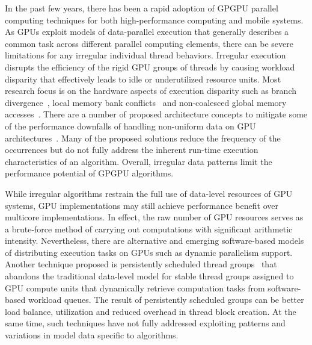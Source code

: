 In the past few years, there has been a rapid adoption of GPGPU
parallel computing techniques for both high-performance computing and
mobile systems.  As GPUs exploit models of data-parallel execution
that generally describes a common task across different parallel
computing elements, there can be severe limitations for any irregular
individual thread behaviors.  Irregular execution disrupts the
efficiency of the rigid GPU groups of threads by causing workload
disparity that effectively leads to idle or underutilized resource
units.  Most research focus is on the hardware aspects of execution
disparity such as branch divergence~\cite{divergence1}, local memory
bank conflicts~\cite{local} and non-coalesced global memory
accesses~\cite{memory}.  There are a number of proposed architecture
concepts to mitigate some of the performance downfalls of handling
non-uniform data on GPU architectures~\cite{divergence2}.  Many of the
proposed solutions reduce the frequency of the occurrences but do not
fully address the inherent run-time execution characteristics of an
algorithm. Overall,
irregular data patterns limit the performance potential of GPGPU
algorithms.

While irregular algorithms restrain the full use of data-level
resources of GPU systems, GPU implementations may still achieve
performance benefit over multicore implementations. In effect, the raw
number of GPU resources serves as a brute-force method of carrying out
computations with significant arithmetic intensity.  Nevertheless,
there are alternative and emerging software-based models of
distributing execution tasks on GPUs such as dynamic parallelism
support. Another technique proposed is persistently scheduled thread
groups~\cite{Gupta:2012:ASO} that abandons the traditional data-level
model for stable thread groups assigned to GPU compute units that
dynamically retrieve computation tasks from software-based workload
queues.  The result of persistently scheduled groups can be better
load balance, utilization and reduced overhead in thread block
creation. At the same time, such techniques have not fully addressed
exploiting patterns and variations in model data specific to
algorithms.

